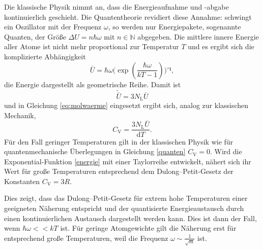 Die klassische Physik nimmt an, dass die Energieaufnahme und -abgabe kontinuierlich geschieht.
Die Quantentheorie revidiert diese Annahme: 
schwingt ein Oszillator mit der Frequenz $\omega$, so werden nur Energiepakete, sogenannte Quanten, der Größe $\Delta{U}=n \hbar \omega$ mit $n\in\mathbb{N} $ abgegeben.
Die mittlere innere Energie aller Atome ist nicht mehr proportional zur Temperatur $T$ und es ergibt sich die komplizierte Abhängigkeit
\begin{equation}
	{\bar{U}=\hbar\omega(\exp(\frac{\hbar\omega}{kT-1})})⁻¹,
	\label{energie}
\end{equation}
die Energie dargestellt als geometrische Reihe.
Damit ist
\begin{equation}
	\tilde{{\bar{U}}}=3N_\mathup{L}\bar{U}
\end{equation}
und in Gleichung \eqref{eq:molwaerme} eingesetzt ergibt sich, analog zur klassischen Mechanik,    
\begin{equation}
	C_\mathup{V}=\frac{3N_\mathup{L}\bar{U}}{\mathup{d}T}.
	\label{quanten}
\end{equation}
Für den Fall geringer Temperaturen gilt in der klassischen Physik wie für quantenmechanische Überlegungen in Gleichung \eqref{quanten} $C_\mathup{V}=0$. 
Wird die Exponential-Funktion \eqref{energie} mit einer Taylorreihe entwickelt, nähert sich ihr Wert für große Temperaturen entsprechend dem Dulong--Petit-Gesetz der Konstanten $C_\mathup{V}=3R$.

Dies zeigt, dass das Dulong--Petit-Gesetz für extrem hohe Temperaturen einer geeigneten Näherung entspricht und der quantisierte Energieaustausch durch einen kontinuierlichen Austausch dargestellt werden kann. 
Dies ist dann der Fall, wenn $\hbar\omega<<kT$ ist. 
Für geringe Atomgewichte gilt die Näherung erst für entsprechend große Temperaturen, weil die Frequenz $\omega\sim\frac{1}{\sqrt{m}}$ ist.


